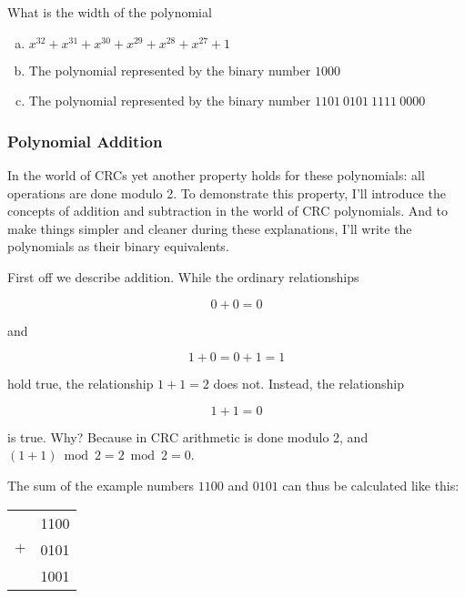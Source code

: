 \begin{Exercise}[label={width-poly}]

  What is the width of the polynomial

  \begin{enumerate}[(a)]
  \item $x^{32} + x^{31} + x^{30} + x^{29} + x^{28} + x^{27} + 1 $
  \item The polynomial represented by the binary number $1000$
  \item The polynomial represented by the binary number $1101\ 0101\
    1111\ 0000$
  \end{enumerate}

\end{Exercise}

\subsubsection{Polynomial Addition}

In the world of CRCs yet another property holds for these polynomials:
all operations are done modulo 2. To demonstrate this property, I'll
introduce the concepts of addition and subtraction in the world of CRC
polynomials. And to make things simpler and cleaner during these
explanations, I'll write the polynomials as their binary equivalents.

First off we describe addition. While the ordinary relationships

\begin{equation*}
  0 + 0 = 0
\end{equation*}

and

\begin{equation*}
  1 + 0 = 0 + 1 = 1
\end{equation*}

hold true, the relationship $1 + 1 = 2$
does not. Instead, the relationship

\begin{equation*}
  1 + 1 = 0
\end{equation*}

is true.  Why? Because in CRC arithmetic is done modulo 2, and $(1 +
1) \bmod 2 = 2 \bmod 2 = 0$.

The sum of the example numbers $1100$ and $0101$ can thus be
calculated like this:

\begin{center}
  \begin{tabular}{lr}
    & 1100  \\
    $+$ & 0101 \\
    \hline
    & 1001 \\
  \end{tabular}
\end{center}

